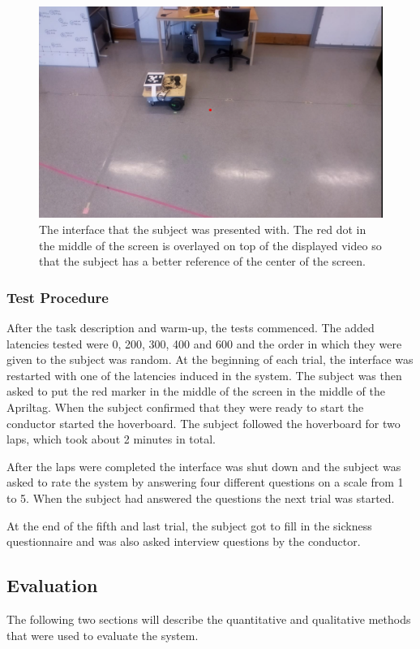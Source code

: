 \documentclass[nofilelist]{cslthse-msc}
\begin{document}
\begin{figure}[!hbt]
   \centering
   \includegraphics[scale=0.3]{images/interface.png} 
   \caption{The interface that the subject was presented with. The red dot in the middle of the screen is overlayed on top of the displayed video so that the subject has a better reference of the center of the screen.}
   \label{fig:interface}
\end{figure}

\subsubsection{Test Procedure}
After the task description and warm-up, the tests commenced. The added latencies tested were 0, 200, 300, 400 and 600 and the order in which they were given to the subject was random. 
At the beginning of each trial, the interface was restarted with one of the latencies induced in the system. The subject was then asked to put the red marker in the middle of the screen in the middle of the Apriltag. When the subject confirmed that they were ready to start the conductor started the hoverboard. The subject followed the hoverboard for two laps, which took about 2 minutes in total.

After the laps were completed the interface was shut down and the subject was asked to rate the system by answering four different questions on a scale from 1 to 5. When the subject had answered the questions the next trial was started.

At the end of the fifth and last trial, the subject got to fill in the sickness questionnaire and was also asked interview questions by the conductor.

\subsection{Evaluation}
The following two sections will describe the quantitative and qualitative methods that were used to evaluate the system.
\end{document}
